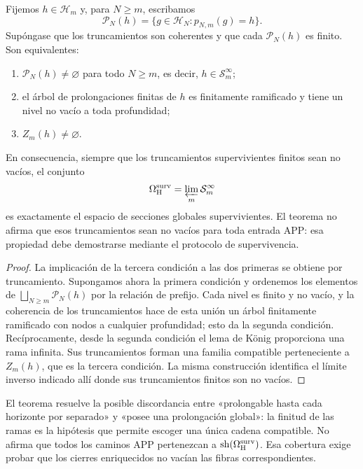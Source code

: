 \begin{theorem}
\label{thm:criterio-extension-superviviente}
Fijemos \(h\in\mathcal H_m\) y, para \(N\geq m\), escribamos
\[
 \mathcal P_N(h)=\{g\in\mathcal H_N:p_{N,m}(g)=h\}.
\]
Supóngase que los truncamientos son coherentes y que cada
\(\mathcal P_N(h)\) es finito. Son equivalentes:
\begin{enumerate}
  \item \(\mathcal P_N(h)\ne\varnothing\) para todo \(N\geq m\), es decir,
  \(h\in\mathcal S_m^\infty\);
  \item el árbol de prolongaciones finitas de \(h\) es finitamente ramificado
  y tiene un nivel no vacío a toda profundidad;
  \item \(Z_m(h)\ne\varnothing\).
\end{enumerate}
En consecuencia, siempre que los truncamientos supervivientes finitos sean no
vacíos, el conjunto
\[
 \Omega_{\rm H}^{\rm surv}
 =\varprojlim_m\mathcal S_m^\infty
\]
es exactamente el espacio de secciones globales supervivientes. El teorema no
afirma que esos truncamientos sean no vacíos para toda entrada APP: esa
propiedad debe demostrarse mediante el protocolo de supervivencia.
\end{theorem}

\begin{proof}
La implicación de la tercera condición a las dos primeras se obtiene por
truncamiento. Supongamos ahora la primera condición y ordenemos los elementos de
\(\bigsqcup_{N\geq m}\mathcal P_N(h)\) por la relación de prefijo. Cada nivel
es finito y no vacío, y la coherencia de los truncamientos hace de esta unión
un árbol finitamente ramificado con nodos a cualquier profundidad; esto da la
segunda condición. Recíprocamente, desde la segunda condición el lema de König
proporciona una rama infinita. Sus truncamientos forman una familia compatible
perteneciente a \(Z_m(h)\), que es la tercera condición. La misma construcción
identifica el límite inverso indicado allí donde sus truncamientos finitos son
no vacíos.
\end{proof}

El teorema resuelve la posible discordancia entre «prolongable hasta cada
horizonte por separado» y «posee una prolongación global»: la finitud de las
ramas es la hipótesis que permite escoger una única cadena compatible. No
afirma que todos los caminos APP pertenezcan a
\(\operatorname{sh}(\Omega_{\rm H}^{\rm surv})\). Esa cobertura exige probar
que los cierres enriquecidos no vacían las fibras correspondientes.

